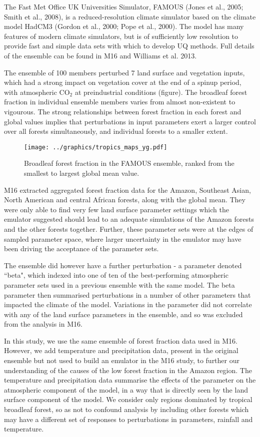 \documentclass[gmd, manuscript]{copernicus}
\begin{document}
The Fast Met Office UK Universities Simulator, FAMOUS (Jones et al., 2005; Smith et al., 2008), is a reduced-resolution climate simulator based on the climate model HadCM3 (Gordon et al., 2000; Pope et al., 2000). The model has many features of modern climate simulators, but is of sufficiently low resolution to provide fast and simple data sets with which to develop UQ methods. Full details of the ensemble can be found in M16 and Williams et al. 2013.

The ensemble of 100 members perturbed 7 land surface and vegetation inputs, which had a strong impact on vegetation cover at the end of a spinup period, with atmospheric CO$_2$ at preindustrial conditions (figure). The broadleaf forest fraction in individual ensemble members varies from almost non-existent to vigourous. The strong relationships between forest fraction in each forest and global values implies that perturbations in input parameters exert a larger control over all forests simultaneously, and individual forests to a smaller extent.

\begin{figure}[t]
\texttt{[image: ../graphics/tropics\_maps\_yg.pdf]}
\caption{Broadleaf forest fraction in the FAMOUS ensemble, ranked from the smallest to largest global mean value.}
\end{figure}


M16 extracted aggregated forest fraction data for the Amazon, Southeast Asian, North American and central African forests, along with the global mean. They were only able to find very few land surface parameter settings which the emulator suggested should lead to an adequate simulations of the Amazon forests and the other forests together. Further, these parameter sets were at the edges of sampled parameter space, where larger uncertainty in the emulator may have been driving the acceptance of the parameter sets. 

The ensemble did however have a further perturbation - a parameter denoted ``beta", which indexed into one of ten of the best-performing atmospheric parameter sets used in a previous ensemble with the same model. The beta parameter then summarised perturbations in a number of other parameters that impacted the climate of the model. Variations in the  parameter did not correlate with any of the land surface parameters in the ensemble, and so  was excluded from the analysis in M16.
 
In this study, we use the same ensemble of forest fraction data used in M16. However, we add temperature and precipitation data, present in the original ensemble but not used to build an emulator in the M16 study, to further our understanding of the causes of the low forest fraction in the Amazon region. The temperature and precipitation data summarise the effects of the parameter on the atmospheric component of the model, in a way that is directly seen by the land surface component of the model. We consider only regions dominated by tropical broadleaf forest, so as not to confound analysis by including other forests which may have a different set of responses to perturbations in parameters, rainfall and temperature.
\end{document}
